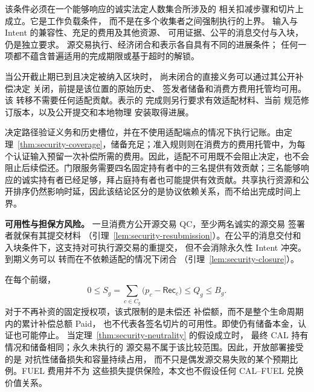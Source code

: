 该条件必须在一个能够响应的诚实法定人数集合所涉及的
相关扣减步骤和切片上成立。它是工作负载条件，
而不是在多个收集者之间强制执行的上界。
输入与 Intent 的兼容性、充足的费用及其他资源、
可用证据、公平的消息交付与入块，仍是独立要求。
源交易执行、经济闭合和表示各自具有不同的进展条件；
任何一项都不蕴含普遍适用的完成期限或基于超时的解锁。

\begin{lemma}[经济闭合不等待适配]
\label{lem:security-closure}
当公开截止期已到且决定被纳入区块时，
尚未闭合的直接义务可以通过其公开补偿决定
关闭，前提是该位置的原始历史、
签发者储备和消费方费用托管均可用。该
转移不需要任何适配贡献。表示的
完成则另行要求有效适配材料、当前
规范修订版本，以及公开提交和本地物理
安装取得进展。
\end{lemma}
\begin{IEEEproof}
决定路径验证义务和历史槽位，并在不使用适配端点的情况下执行记账。由定理~\ref{thm:security-coverage}，储备充足；准入规则则在消费方的费用托管中，为每个认证输入预留一次补偿所需的费用。因此，适配不可用既不会阻止决定，也不会阻止后续偿还。门限服务需要四名固定持有者中的三名提供有效贡献；三名能够响应的诚实持有者已经足够，拜占庭持有者也可能提供有效贡献。共享执行资源和公开排序仍然影响时延，因此该结论区分的是协议依赖关系，而不给出完成时间上界。
\end{IEEEproof}

\noindent\textbf{可用性与担保方风险。}
一旦消费方公开源交易 QC，至少两名诚实的源交易
签署者就保有其提交材料
（引理~\ref{lem:security-resubmission}）。在公平的消息交付和
入块条件下，这支持对可执行源交易的重提交，
但不会消除永久性 Intent 冲突。到期义务可以
转而在不依赖适配的情况下闭合
（引理~\ref{lem:security-closure}）。

在每个前缀，
\[
  0\le S_g=\sum_{c\in C_g}
       \bigl(p_c-\mathsf{Rec}_c\bigr)\le Q_g\le B_g .
\]
对于不再补资的固定授权项，该式限制的是未偿还
补偿额，而不是整个生命周期内的累计补偿总额 Paid，
也不代表各签名切片的可用性。即使仍有储备本金，认证也可能停止。
当定理~\ref{thm:security-neutrality} 的假设成立时，
最终 CAL 持有情况和储备相同；永久未执行的
源交易不属于该比较范围。因此，开放部署接受的是
对抗性储备损失和容量持续占用，
而不只是偶发源交易失败的某个预期比例。FUEL 费用并不为
这些损失提供保险，本文也不假设任何 CAL--FUEL 兑换价值关系。

